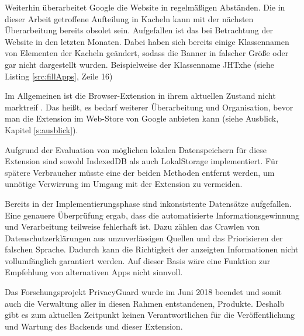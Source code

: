 Weiterhin überarbeitet Google die Website in regelmäßigen Abständen. Die in dieser Arbeit getroffene Aufteilung in Kacheln kann mit der nächsten Überarbeitung bereits obsolet sein. Aufgefallen ist das bei Betrachtung der Website in den letzten Monaten. Dabei haben sich bereits einige Klassennamen von Elementen der Kacheln geändert, sodass die Banner in falscher Größe oder gar nicht dargestellt wurden. Beispielweise der Klassenname \glqq JHTxhe \grqq{} (siehe Listing \ref{src:fillApps}, Zeile 16)

Im Allgemeinen ist die Browser-Extension in ihrem aktuellen Zustand nicht \glqq marktreif \grqq{}. Das heißt, es bedarf weiterer Überarbeitung und Organisation, bevor man die Extension im Web-Store von Google anbieten kann (siehe Ausblick, Kapitel \ref{s:ausblick}). 

Aufgrund der Evaluation von möglichen lokalen Datenspeichern für diese Extension sind sowohl \glqq IndexedDB\grqq{} als auch \glqq LokalStorage\grqq{} implementiert. Für spätere Verbraucher müsste eine der beiden Methoden entfernt werden, um unnötige Verwirrung im Umgang mit der Extension zu vermeiden.

Bereits in der Implementierungsphase sind inkonsistente Datensätze aufgefallen. Eine genauere Überprüfung ergab, dass die automatisierte Informationsgewinnung und Verarbeitung teilweise fehlerhaft ist. Dazu zählen das Crawlen von Datenschutzerklärungen aus unzuverlässigen Quellen und das Priorisieren der falschen Sprache. Dadurch kann die Richtigkeit der anzeigten Informationen nicht vollumfänglich garantiert werden. Auf dieser Basis wäre eine Funktion zur Empfehlung von alternativen Apps nicht sinnvoll.

Das Forschungsprojekt PrivacyGuard wurde im Juni 2018 beendet und somit auch die Verwaltung aller in diesen Rahmen entstandenen, Produkte. Deshalb gibt es zum aktuellen Zeitpunkt keinen Verantwortlichen für die Veröffentlichung und Wartung des Backends und dieser Extension.